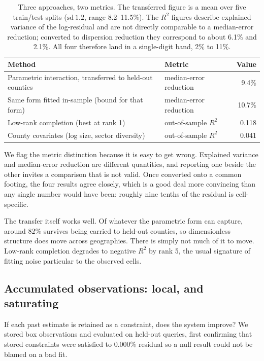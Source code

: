 \documentclass[11pt]{article}
\begin{document}
\begin{table}[h]
\centering
\begin{tabular}{llr}
\toprule
Method & Metric & Value \\
\midrule
Parametric interaction, transferred to held-out counties & median-error reduction & 9.4\% \\
Same form fitted in-sample (bound for that form)         & median-error reduction & 10.7\% \\
Low-rank completion (best at rank 1)                     & out-of-sample $R^2$    & 0.118 \\
County covariates (log size, sector diversity)           & out-of-sample $R^2$    & 0.041 \\
\bottomrule
\end{tabular}
\caption{Three approaches, two metrics. The transferred figure is a mean over five
train/test splits ($\mathrm{sd}\ 1.2$, range 8.2--11.5\%). The $R^2$ figures describe explained
variance of the log-residual and are not directly comparable to a median-error
reduction; converted to dispersion reduction they correspond to about 6.1\% and
2.1\%. All four therefore land in a single-digit band, 2\% to 11\%.}
\label{tab:ceiling}
\end{table}

We flag the metric distinction because it is easy to get wrong. Explained
variance and median-error reduction are different quantities, and reporting one
beside the other invites a comparison that is not valid. Once converted onto a
common footing, the four results agree closely, which is a good deal more
convincing than any single number would have been: roughly nine tenths of the
residual is cell-specific.

The transfer itself works well. Of whatever the parametric form can capture,
around 82\% survives being carried to held-out counties, so dimensionless structure does
move across geographies. There is simply not much of it to move. Low-rank
completion degrades to negative $R^2$ by rank 5, the usual signature of fitting
noise particular to the observed cells.

\subsection{Accumulated observations: local, and saturating}
\label{sec:storage}

If each past estimate is retained as a constraint, does the system improve? We
stored box observations and evaluated on held-out queries, first confirming that
stored constraints were satisfied to 0.000\% residual so a null result could not
be blamed on a bad fit.
\end{document}
